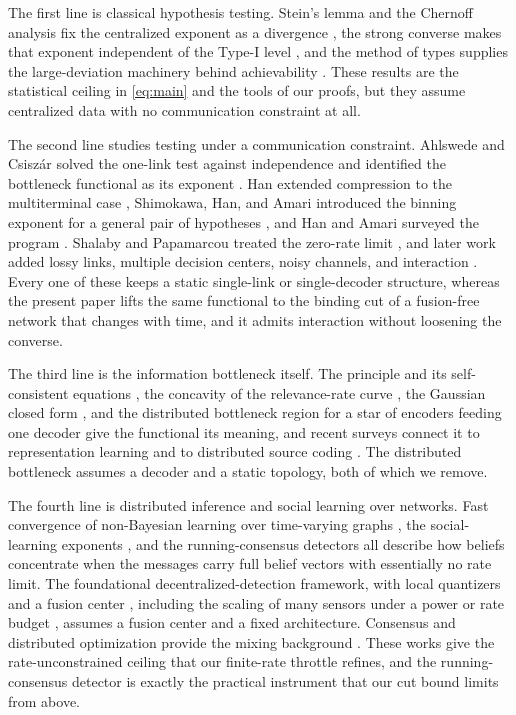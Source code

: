 \documentclass[journal]{IEEEtran}
\theoremstyle{definition}
\theoremstyle{remark}
\begin{document}
The first line is classical hypothesis testing. Stein's lemma and the Chernoff analysis fix the centralized
exponent as a divergence \cite{chernoff1952,coverthomas2006}, the strong converse makes that exponent independent
of the Type-I level \cite{hankobayashi1989}, and the method of types supplies the large-deviation
machinery behind achievability \cite{csiszarkorner2011,dembozeitouni1998}. These results are the
statistical ceiling in \eqref{eq:main} and the tools of our proofs, but they assume centralized data with no
communication constraint at all.

The second line studies testing under a communication constraint. Ahlswede and Csisz\'ar solved the one-link test
against independence and identified the bottleneck functional as its exponent \cite{ahlswedecsiszar1986}. Han
extended compression to the multiterminal case \cite{han1987}, Shimokawa, Han, and Amari introduced the binning
exponent for a general pair of hypotheses \cite{sha1994}, and Han and Amari surveyed the program
\cite{hanamari1998}. Shalaby and Papamarcou treated the zero-rate limit \cite{shalaby1992}, and later work added
lossy links, multiple decision centers, noisy channels, and interaction
\cite{katz2017,salehkalaibar2018,sreekumar2020,xiangkim2013}. Every one of these keeps a static
single-link or single-decoder structure, whereas the present paper lifts the same functional to the binding cut
of a fusion-free network that changes with time, and it admits interaction without loosening the converse.

The third line is the information bottleneck itself. The principle and its self-consistent equations
\cite{tishby1999}, the concavity of the relevance-rate curve \cite{giladbachrach2003}, the Gaussian closed form
\cite{chechik2005}, and the distributed bottleneck region for a star of encoders feeding one decoder
\cite{aguerrizaidi2018,aguerrizaidi2021} give the functional its meaning, and recent surveys connect it to
representation learning and to distributed source coding \cite{goldfeld2020,zaidi2020}. The distributed
bottleneck assumes a decoder and a static topology, both of which we remove.

The fourth line is distributed inference and social learning over networks. Fast convergence of non-Bayesian
learning over time-varying graphs \cite{nou2017}, the social-learning exponents
\cite{lalitha2018,shahrampour2016,jadbabaie2012,molavi2018}, and the running-consensus detectors
\cite{bajovic2011,braca2010} all describe how beliefs concentrate when the messages carry full
belief vectors with essentially no rate limit. The foundational decentralized-detection framework, with local
quantizers and a fusion center \cite{tsitsiklis1988,tsitsiklis1993,tenneysandell1981,%
viswanathan1997}, including the scaling of many sensors under a power or rate budget
\cite{chamberland2003}, assumes a fusion center and a fixed architecture. Consensus and
distributed optimization provide the mixing background \cite{olfatisaber2007,nedicozdaglar2009}. These works give the rate-unconstrained ceiling that our finite-rate throttle
refines, and the running-consensus detector is exactly the practical instrument that our cut bound limits from
above.
\end{document}
